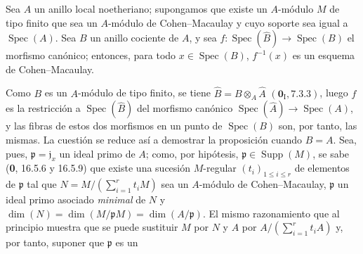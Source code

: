 \begin{proposition}[6.3.8]
\label{IV.2.s6.3.8-fr}
Sea $A$ un anillo local noetheriano; supongamos que existe un $A$-módulo $M$
de tipo finito que sea un $A$-módulo de Cohen--Macaulay y cuyo soporte sea
igual a $\operatorname{Spec}(A)$. Sea $B$ un anillo cociente de $A$, y sea
$f:\operatorname{Spec}(\widehat B)\to\operatorname{Spec}(B)$ el morfismo
canónico; entonces, para todo $x\in\operatorname{Spec}(B)$, $f^{-1}(x)$ es un
esquema de Cohen--Macaulay.
\end{proposition}

Como $B$ es un $A$-módulo de tipo finito, se tiene
$\widehat B=B\otimes_A\widehat A$ $(\mathbf{0}_{\mathrm I}, 7.3.3)$, luego $f$ es la
restricción a $\operatorname{Spec}(\widehat B)$ del morfismo canónico
$\operatorname{Spec}(\widehat A)\to\operatorname{Spec}(A)$, y las fibras de
estos dos morfismos en un punto de $\operatorname{Spec}(B)$ son, por tanto,
las mismas. La cuestión se reduce así a demostrar la proposición cuando $B=A$.
Sea, pues, $\mathfrak p=\mathfrak j_x$ un ideal primo de $A$; como, por
hipótesis, $\mathfrak p\in\operatorname{Supp}(M)$, se sabe (\textbf 0, 16.5.6 y
16.5.9) que existe una sucesión $M$-regular $(t_i)_{1\leq i\leq r}$
de elementos de $\mathfrak p$ tal que
$N=M/(\sum_{i=1}^{r}t_iM)$
sea un $A$-módulo de Cohen--Macaulay, $\mathfrak p$ un ideal primo asociado
\emph{minimal} de $N$ y
$\dim(N)=\dim(M/\mathfrak pM)=\dim(A/\mathfrak p)$. El mismo razonamiento
que al principio muestra que se puede sustituir $M$ por $N$ y $A$ por
$A/(\sum_{i=1}^{r}t_iA)$ y, por tanto, suponer que $\mathfrak p$ es un


